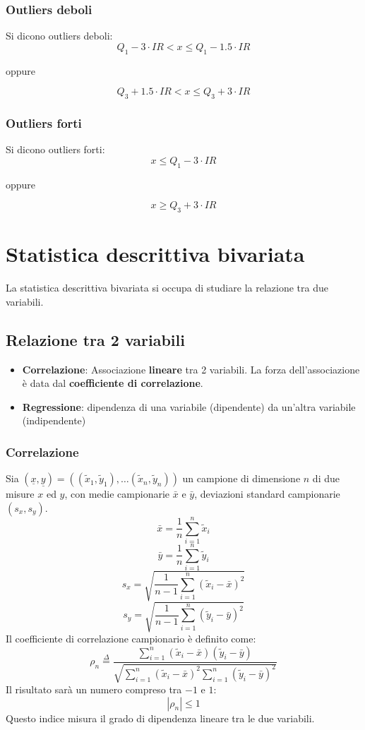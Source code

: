 \documentclass[a4paper]{article}
\theoremstyle{break}
\theoremstyle{break}
\theoremstyle{break}
\theoremstyle{break}
\begin{document}
\subsubsection{Outliers deboli}
Si dicono outliers deboli:
\[
	Q_1 - 3 \cdot IR < x \le Q_1 - 1.5 \cdot IR
\]
\begin{center}
	oppure
\end{center}
\[
	Q_3 + 1.5 \cdot IR < x \le Q_3 + 3 \cdot IR
\]

\subsubsection{Outliers forti}
Si dicono outliers forti:
\[
	x \le Q_1 - 3 \cdot IR
\]
\begin{center}
	oppure
\end{center}
\[
	x \ge Q_3 + 3 \cdot IR
\]
\section{Statistica descrittiva bivariata}
La statistica descrittiva bivariata si occupa di studiare la relazione tra due variabili.

\subsection{Relazione tra 2 variabili}
\begin{itemize}
	\item \textbf{Correlazione}: Associazione \textbf{lineare} tra 2 variabili. La forza
	      dell'associazione è data dal \textbf{coefficiente di correlazione}.
	\item \textbf{Regressione}: dipendenza di una variabile (dipendente) da
	      un’altra variabile (indipendente)
\end{itemize}

\subsubsection{Correlazione}
Sia \( (\underline{x}, \underline{y}) = ((\tilde{x}_1, \tilde{y}_1), \ldots (\tilde{x}_n, \tilde{y}_n)) \)
un campione di dimensione \( n \) di due misure \( x \) ed \( y \), con medie campionarie
\( \bar{x} \) e \( \bar{y} \), deviazioni standard campionarie \( (s_x, s_y) \).
\[
	\bar{x} = \frac{1}{n} \sum_{i=1}^{n} \tilde{x}_i
\]
\[
	\bar{y} = \frac{1}{n} \sum_{i=1}^{n} \tilde{y}_i
\]
\[
	s_x = \sqrt{\frac{1}{n-1} \sum_{i=1}^{n} (\tilde{x}_i - \bar{x})^2}
\]
\[
	s_y = \sqrt{\frac{1}{n-1} \sum_{i=1}^{n} (\tilde{y}_i - \bar{y})^2}
\]
Il coefficiente di correlazione campionario è definito come:
\[
	\rho_n \stackrel{\Delta}{=} \frac{\sum_{i=1}^{n} (\tilde{x}_i - \bar{x})
		(\tilde{y}_i - \bar{y})}{\sqrt{\sum_{i=1}^{n} (\tilde{x}_i - \bar{x})^2
			\sum_{i=1}^{n} (\tilde{y}_i - \bar{y})^2}}
\]
Il risultato sarà un numero compreso tra \( -1 \) e \( 1 \):
\[
	| \rho_n | \le 1
\]
Questo indice misura il grado di dipendenza lineare tra le due variabili.
\end{document}
